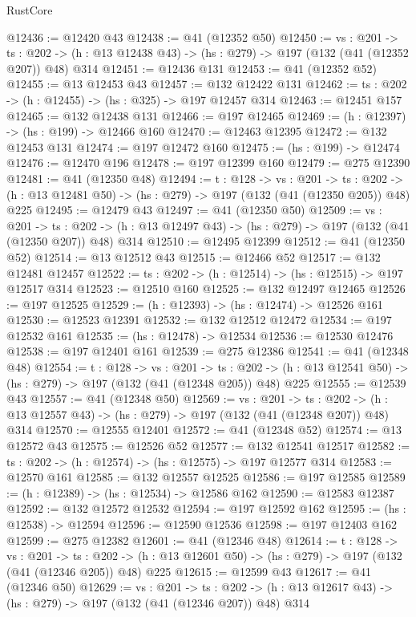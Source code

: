 \begin{lexlean}{RustCore}
\begin{coremodule}
@12436 := @12420 @43
@12438 := @41 (@12352 @50)
@12450 := {vs : @201} ->
  {ts : @202} -> (h : @13 @12438 @43) -> (hs : @279) -> @197 (@132 (@41 (@12352 @207)) @48) @314
@12451 := @12436 @131
@12453 := @41 (@12352 @52)
@12455 := @13 @12453 @43
@12457 := @132 @12422 @131
@12462 := {ts : @202} -> (h : @12455) -> (hs : @325) -> @197 @12457 @314
@12463 := @12451 @157
@12465 := @132 @12438 @131
@12466 := @197 @12465
@12469 := (h : @12397) -> (hs : @199) -> @12466 @160
@12470 := @12463 @12395
@12472 := @132 @12453 @131
@12474 := @197 @12472 @160
@12475 := (hs : @199) -> @12474
@12476 := @12470 @196
@12478 := @197 @12399 @160
@12479 := @275 @12390
@12481 := @41 (@12350 @48)
@12494 := {t : @128} ->
  {vs : @201} ->
  {ts : @202} -> (h : @13 @12481 @50) -> (hs : @279) -> @197 (@132 (@41 (@12350 @205)) @48) @225
@12495 := @12479 @43
@12497 := @41 (@12350 @50)
@12509 := {vs : @201} ->
  {ts : @202} -> (h : @13 @12497 @43) -> (hs : @279) -> @197 (@132 (@41 (@12350 @207)) @48) @314
@12510 := @12495 @12399
@12512 := @41 (@12350 @52)
@12514 := @13 @12512 @43
@12515 := @12466 @52
@12517 := @132 @12481 @12457
@12522 := {ts : @202} -> (h : @12514) -> (hs : @12515) -> @197 @12517 @314
@12523 := @12510 @160
@12525 := @132 @12497 @12465
@12526 := @197 @12525
@12529 := (h : @12393) -> (hs : @12474) -> @12526 @161
@12530 := @12523 @12391
@12532 := @132 @12512 @12472
@12534 := @197 @12532 @161
@12535 := (hs : @12478) -> @12534
@12536 := @12530 @12476
@12538 := @197 @12401 @161
@12539 := @275 @12386
@12541 := @41 (@12348 @48)
@12554 := {t : @128} ->
  {vs : @201} ->
  {ts : @202} -> (h : @13 @12541 @50) -> (hs : @279) -> @197 (@132 (@41 (@12348 @205)) @48) @225
@12555 := @12539 @43
@12557 := @41 (@12348 @50)
@12569 := {vs : @201} ->
  {ts : @202} -> (h : @13 @12557 @43) -> (hs : @279) -> @197 (@132 (@41 (@12348 @207)) @48) @314
@12570 := @12555 @12401
@12572 := @41 (@12348 @52)
@12574 := @13 @12572 @43
@12575 := @12526 @52
@12577 := @132 @12541 @12517
@12582 := {ts : @202} -> (h : @12574) -> (hs : @12575) -> @197 @12577 @314
@12583 := @12570 @161
@12585 := @132 @12557 @12525
@12586 := @197 @12585
@12589 := (h : @12389) -> (hs : @12534) -> @12586 @162
@12590 := @12583 @12387
@12592 := @132 @12572 @12532
@12594 := @197 @12592 @162
@12595 := (hs : @12538) -> @12594
@12596 := @12590 @12536
@12598 := @197 @12403 @162
@12599 := @275 @12382
@12601 := @41 (@12346 @48)
@12614 := {t : @128} ->
  {vs : @201} ->
  {ts : @202} -> (h : @13 @12601 @50) -> (hs : @279) -> @197 (@132 (@41 (@12346 @205)) @48) @225
@12615 := @12599 @43
@12617 := @41 (@12346 @50)
@12629 := {vs : @201} ->
  {ts : @202} -> (h : @13 @12617 @43) -> (hs : @279) -> @197 (@132 (@41 (@12346 @207)) @48) @314

\end{coremodule}
\end{lexlean}

